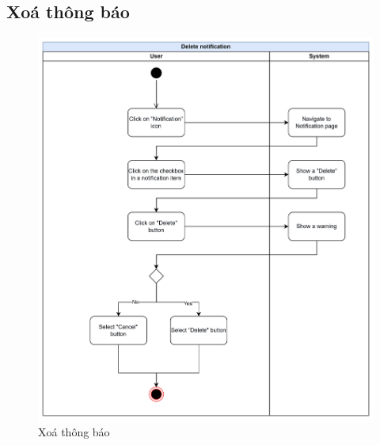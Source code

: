 \subsection{Xoá thông báo}
    \begin{figure}[H]
        \centering
        \includegraphics[width=\linewidth]{Content/Phân tích và thiết kế hệ thống/documents/Sơ đồ hoạt động/images/deleteNotification.png}
        \vspace{0.5cm}
        \caption{Xoá thông báo}
        \label{fig:Xoá thông báo}
    \end{figure}